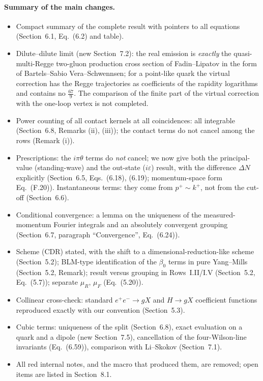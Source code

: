 \documentclass[a4paper,11pt]{article}
\begin{document}
\paragraph{Summary of the main changes.}
\begin{itemize}[leftmargin=1.5em,itemsep=1pt]
\item Compact summary of the complete result with pointers to all equations (Section~6.1, Eq.~(6.2) and table).
\item Dilute--dilute limit (new Section~7.2): the real emission is \emph{exactly} the quasi-multi-Regge two-gluon production cross section of Fadin--Lipatov in the form of Bartels--Sabio Vera--Schwennsen; for a point-like quark the virtual correction has the Regge trajectories as coefficients of the rapidity logarithms and contains no $\frac{67}{9}$. The comparison of the finite part of the virtual correction with the one-loop vertex is not completed.
\item Power counting of all contact kernels at all coincidences: all integrable (Section~6.8, Remarks (ii), (iii)); the contact terms do not cancel among the rows (Remark (i)).
\item Prescriptions: the $i\pi\theta$ terms do \emph{not} cancel; we now give both the principal-value (standing-wave) and the out-state ($i\varepsilon$) result, with the difference $\Delta N$ explicitly (Section~6.5, Eqs.~(6.18), (6.19); momentum-space form Eq.~(F.20)). Instantaneous terms: they come from $p^+\sim k^+$, not from the cut-off (Section~6.6).
\item Conditional convergence: a lemma on the uniqueness of the measured-momentum Fourier integrals and an absolutely convergent grouping (Section~6.7, paragraph ``Convergence'', Eq.~(6.24)).
\item Scheme (CDR) stated, with the shift to a dimensional-reduction-like scheme (Section~5.2); BLM-type identification of the $\beta_0$ terms in pure Yang--Mills (Section~5.2, Remark); result versus grouping in Rows~I.II/I.V (Section~5.2, Eq.~(5.7)); separate $\mu_R$, $\mu_F$ (Eq.~(5.20)).
\item Collinear cross-check: standard $e^+e^-\to gX$ and $H\to gX$ coefficient functions reproduced exactly with our convention (Section~5.3).
\item Cubic terms: uniqueness of the split (Section~6.8), exact evaluation on a quark and a dipole (new Section~7.5), cancellation of the four-Wilson-line invariants (Eq.~(6.59)), comparison with Li--Skokov (Section~7.1).
\item All red internal notes, and the macro that produced them, are removed; open items are listed in Section~8.1.
\end{itemize}
\end{document}
